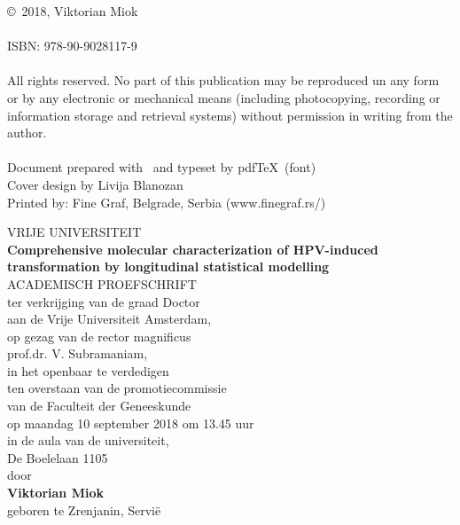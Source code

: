 \documentclass[notitlepage,twoside,10pt,openright,leqno]{Classes/PhDThesisPSnPDF} %
\begin{document}
\vfill

\noindent
{\selectfont \copyright}~2018, Viktorian Miok\\
\\
\noindent
ISBN: 978-90-9028117-9\\
\vspace{0.2cm}\\
\noindent
All rights reserved. No part of this publication may be reproduced un any form or by
any electronic or mechanical means (including photocopying, recording or information
storage and retrieval systems) without permission in writing from the author.
\\
\\
Document prepared with {\selectfont \LaTeXe\ }and typeset by pdf{\selectfont \TeX\ }(font)\\ 
Cover design by Livija Blanozan\\
Printed by: Fine Graf, Belgrade, Serbia (www.finegraf.rs/)

\newpage
\begin{titlepage}
	\centering
	VRIJE UNIVERSITEIT\\
\vspace{2cm}
  {\bf\fontsize{16pt}{1em}\selectfont Comprehensive molecular characterization of HPV-induced transformation by longitudinal statistical modelling\\}
  \vspace{2cm}
ACADEMISCH PROEFSCHRIFT\\
\vspace{1.5cm}
ter verkrijging van de graad Doctor \\
aan de Vrije Universiteit Amsterdam,\\
op gezag van de rector magnificus\\
prof.dr. V. Subramaniam,\\
in het openbaar te verdedigen\\
ten overstaan van de promotiecommissie\\
van de Faculteit der Geneeskunde\\
op maandag 10 september 2018 om 13.45 uur\\
in de aula van de universiteit,\\
De Boelelaan 1105\\
\vspace{1.5cm}
door\\
\vspace{1.5cm}
\textbf{Viktorian Miok}\\
\vspace{0.5cm}
geboren te Zrenjanin, Servi\"e\\
\end{titlepage}
\end{document}
